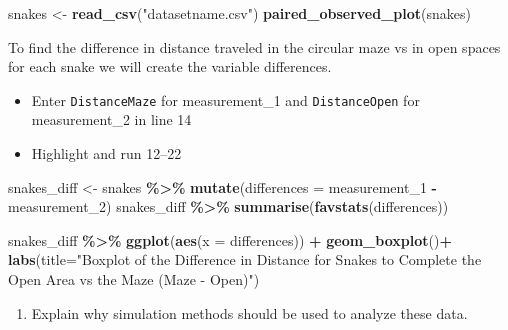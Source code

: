 \documentclass[
]{report}
\newenvironment{Shaded}{\begin{snugshade}}{\end{snugshade}}
\newcommand{\AttributeTok}[1]{\textcolor[rgb]{0.13,0.29,0.53}{#1}}
\newcommand{\FunctionTok}[1]{\textcolor[rgb]{0.13,0.29,0.53}{\textbf{#1}}}
\newcommand{\NormalTok}[1]{#1}
\newcommand{\OtherTok}[1]{\textcolor[rgb]{0.56,0.35,0.01}{#1}}
\newcommand{\SpecialCharTok}[1]{\textcolor[rgb]{0.81,0.36,0.00}{\textbf{#1}}}
\newcommand{\StringTok}[1]{\textcolor[rgb]{0.31,0.60,0.02}{#1}}
\providecommand{\tightlist}{%
  \setlength{\itemsep}{0pt}\setlength{\parskip}{0pt}}
\begin{document}
\begin{Shaded}
\begin{Highlighting}[]
\NormalTok{snakes }\OtherTok{\textless{}{-}} \FunctionTok{read\_csv}\NormalTok{(}\StringTok{"datasetname.csv"}\NormalTok{)}
\FunctionTok{paired\_observed\_plot}\NormalTok{(snakes)}
\end{Highlighting}
\end{Shaded}

To find the difference in distance traveled in the circular maze vs in open spaces for each snake we will create the variable differences.

\begin{itemize}
\item
  Enter \texttt{DistanceMaze} for measurement\_1 and \texttt{DistanceOpen} for measurement\_2 in line 14
\item
  Highlight and run 12--22
\end{itemize}

\begin{Shaded}
\begin{Highlighting}[]
\NormalTok{snakes\_diff }\OtherTok{\textless{}{-}}\NormalTok{ snakes }\SpecialCharTok{\%\textgreater{}\%} 
  \FunctionTok{mutate}\NormalTok{(}\AttributeTok{differences =}\NormalTok{ measurement\_1 }\SpecialCharTok{{-}}\NormalTok{ measurement\_2)}
\NormalTok{snakes\_diff }\SpecialCharTok{\%\textgreater{}\%} 
    \FunctionTok{summarise}\NormalTok{(}\FunctionTok{favstats}\NormalTok{(differences))}

\NormalTok{snakes\_diff }\SpecialCharTok{\%\textgreater{}\%} 
    \FunctionTok{ggplot}\NormalTok{(}\FunctionTok{aes}\NormalTok{(}\AttributeTok{x =}\NormalTok{ differences)) }\SpecialCharTok{+}
    \FunctionTok{geom\_boxplot}\NormalTok{()}\SpecialCharTok{+}
    \FunctionTok{labs}\NormalTok{(}\AttributeTok{title=}\StringTok{"Boxplot of the Difference in Distance for Snakes to }
\StringTok{         Complete the Open Area vs the Maze }
\StringTok{         (Maze {-} Open)"}\NormalTok{)}
\end{Highlighting}
\end{Shaded}

\begin{enumerate}
\def\labelenumi{\arabic{enumi}.}
\tightlist
\item
  Explain why simulation methods should be used to analyze these data.
\end{enumerate}

\vspace{0.6in}
\end{document}
